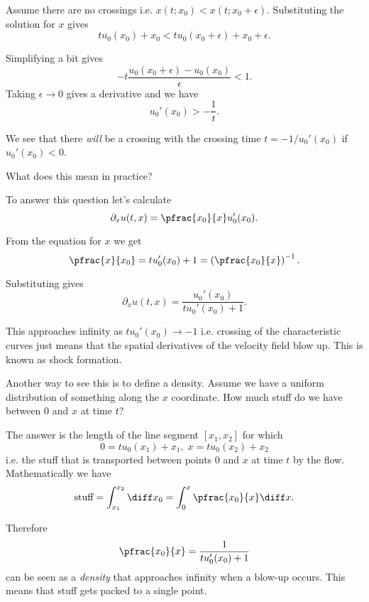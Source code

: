 \begin{frame}
	Assume there are no crossings i.e. $ x(t;x_0) < x(t;x_0 + \epsilon)$. Substituting the solution for $ x $ gives
	\[ t u_0(x_0) + x_0 < t u_0(x_0 + \epsilon) + x_0 + \epsilon. \]
	
	\pause
	Simplifying a bit gives
	\[ -t \frac{u_0(x_0 + \epsilon) - u_0(x_0)}{\epsilon} < 1. \]
	Taking $ \epsilon \to 0 $ gives a derivative and we have
	\[ u_0'(x_0) > -\frac{1}{t}. \]
	
	\pause
	We see that there \emph{will} be a crossing with the crossing time $ t = -1/u_0'(x_0) $ if $ u_0'(x_0)<0 $. 
\end{frame}

\begin{frame}
	What does this mean in practice?
	
	\pause
	To answer this question let's calculate
	\[ \partial_x u(t,x) = \pfrac{x_0}{x} u_0'(x_0). \]
	
	\pause
	From the equation for $ x $ we get 
	\[ \pfrac{x}{x_0} = t u_0'(x_0) + 1 = \left( \pfrac{x_0}{x} \right)^{-1}. \] 
	
	\pause
	Substituting gives 
	\[ \partial_x u(t,x) = \frac{u_0'(x_0)}{t u_0'(x_0) + 1}. \]
	
	\pause
	This approaches infinity as $ t u_0'(x_0) \to -1 $ i.e. crossing of the characteristic curves just means that the spatial derivatives of the velocity field blow up. This is known as \alert{shock formation}.
\end{frame}

\begin{frame}
	Another way to see this is to define a density. Assume we have a uniform distribution of something along the $ x $ coordinate. How much stuff do we have between $ 0 $ and $ x $ at time $ t $?
	
	\pause
	The answer is the length of the line segment $ [x_1,x_2] $ for which
	\[ 0 = t u_0(x_1) + x_1, \; x = t u_0(x_2) + x_2 \]
	i.e. the stuff that is transported between points $ 0 $ and $ x $ at time $ t $ by the flow. Mathematically we have 
	\[ \text{stuff} = \int_{x_1}^{x_2} \diff x_0 = \int_{0}^{x} \pfrac{x_0}{x} \diff x. \]
	
	\pause
	Therefore 
	$$ \pfrac{x_0}{x} = \frac{1}{t u_0'(x_0) + 1} $$ 
	can be seen as a \emph{density} that approaches infinity when a blow-up occurs. This means that stuff gets packed to a single point.
\end{frame}

